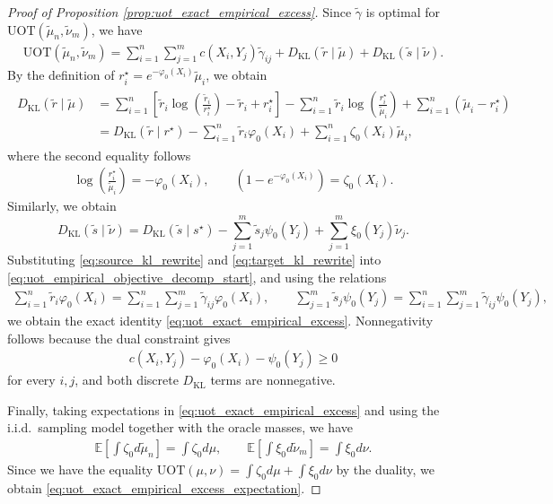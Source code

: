 \documentclass[11pt,reqno]{amsart}
\theoremstyle{definition}
\newcommand{\KL}{\mathrm{KL}}
\renewcommand{\tilde}{\widetilde}
\newcommand{\Ep}{\mathbb{E}}
\begin{document}
\begin{proof}[Proof of Proposition \ref{prop:uot_exact_empirical_excess}]
Since $\tilde\gamma$ is optimal for $\mathrm{UOT}(\tilde\mu_n,\tilde\nu_m)$, we have
\begin{align}
\label{eq:uot_empirical_objective_decomp_start}
\mathrm{UOT}(\tilde\mu_n,\tilde\nu_m)
=
\sum_{i=1}^n\sum_{j=1}^m c(X_i,Y_j)\tilde\gamma_{ij}
+ {D_\KL}(\tilde r \mid \tilde\mu)
+ {D_\KL}(\tilde s \mid \tilde\nu).
\end{align}
By the definition of $r_i^\star = e^{-\varphi_0(X_i)}\tilde\mu_i$, we obtain
\begin{align}
\label{eq:source_kl_rewrite}
\begin{aligned}
{D_\KL}(\tilde r \mid \tilde\mu)
&=
\sum_{i=1}^n
\left[
\tilde r_i \log \left(\frac{\tilde r_i}{r_i^\star}\right)
- \tilde r_i + r_i^\star
\right]
- \sum_{i=1}^n \tilde r_i \log \left(\frac{r_i^\star}{\tilde\mu_i}\right)
+ \sum_{i=1}^n (\tilde\mu_i-r_i^\star) \\
&=
{D_\KL}(\tilde r \mid r^\star)
- \sum_{i=1}^n \tilde r_i   \varphi_0(X_i)
+ \sum_{i=1}^n \zeta_0(X_i)\tilde\mu_i,
\end{aligned}
\end{align}
where the second equality follows
\begin{align}
    \log \left(\frac{r_i^\star}{\tilde\mu_i}\right)
    = -\varphi_0(X_i),
    \qquad
    \left(1-e^{-\varphi_0(X_i)}\right)
    = \zeta_0(X_i).
\end{align}
Similarly, we obtain
\begin{equation}
\label{eq:target_kl_rewrite}
{D_\KL}(\tilde s \mid \tilde\nu)
=
{D_\KL}(\tilde s \mid s^\star)
- \sum_{j=1}^m \tilde s_j   \psi_0(Y_j)
+ \sum_{j=1}^m \xi_0(Y_j)\tilde\nu_j .
\end{equation}
Substituting \eqref{eq:source_kl_rewrite} and \eqref{eq:target_kl_rewrite} into \eqref{eq:uot_empirical_objective_decomp_start}, and using the relations
\begin{align}
    \sum_{i=1}^n \tilde r_i \varphi_0(X_i)
    =
    \sum_{i=1}^n\sum_{j=1}^m \tilde\gamma_{ij}\varphi_0(X_i),
    \qquad
    \sum_{j=1}^m \tilde s_j \psi_0(Y_j)
    =
    \sum_{i=1}^n\sum_{j=1}^m \tilde\gamma_{ij}\psi_0(Y_j),
\end{align}
we obtain the exact identity \eqref{eq:uot_exact_empirical_excess}. Nonnegativity follows because the dual constraint gives
\begin{align}
    c(X_i,Y_j)-\varphi_0(X_i)-\psi_0(Y_j)\ge 0
\end{align}
for every $i,j$, and {both discrete $D_\KL$ terms are nonnegative.}

Finally, taking expectations in \eqref{eq:uot_exact_empirical_excess} and using the i.i.d.\ sampling model together with the oracle masses, we have
\begin{align}
    \Ep\left[\int \zeta_0   d\tilde\mu_n\right]
    = \int \zeta_0   d\mu,
    \qquad
    \Ep\left[\int \xi_0   d\tilde\nu_m\right]
    = \int \xi_0   d\nu.
\end{align}
Since we have the equality $\mathrm{UOT}(\mu,\nu)=\int \zeta_0   d\mu + \int \xi_0   d\nu$ by the duality, we obtain  \eqref{eq:uot_exact_empirical_excess_expectation}.
\end{proof}
\end{document}
